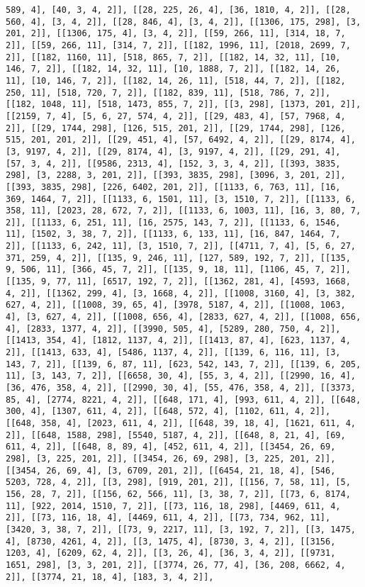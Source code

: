 \documentclass[12pt,fleqn]{article}\usepackage{../../common}
\begin{document}
\begin{verbatim}
589, 4], [40, 3, 4, 2]], [[28, 225, 26, 4], [36, 1810, 4, 2]], [[28, 560, 4], [3, 4, 2]], [[28, 846, 4], [3, 4, 2]], [[1306, 175, 298], [3, 201, 2]], [[1306, 175, 4], [3, 4, 2]], [[59, 266, 11], [314, 18, 7, 2]], [[59, 266, 11], [314, 7, 2]], [[182, 1996, 11], [2018, 2699, 7, 2]], [[182, 1160, 11], [518, 865, 7, 2]], [[182, 14, 32, 11], [10, 146, 7, 2]], [[182, 14, 32, 11], [10, 1888, 7, 2]], [[182, 14, 26, 11], [10, 146, 7, 2]], [[182, 14, 26, 11], [518, 44, 7, 2]], [[182, 250, 11], [518, 720, 7, 2]], [[182, 839, 11], [518, 786, 7, 2]], [[182, 1048, 11], [518, 1473, 855, 7, 2]], [[3, 298], [1373, 201, 2]], [[2159, 7, 4], [5, 6, 27, 574, 4, 2]], [[29, 483, 4], [57, 7968, 4, 2]], [[29, 1744, 298], [126, 515, 201, 2]], [[29, 1744, 298], [126, 515, 201, 201, 2]], [[29, 451, 4], [57, 6492, 4, 2]], [[29, 8174, 4], [3, 9197, 4, 2]], [[29, 8174, 4], [3, 9197, 4, 2]], [[29, 291, 4], [57, 3, 4, 2]], [[9586, 2313, 4], [152, 3, 3, 4, 2]], [[393, 3835, 298], [3, 2288, 3, 201, 2]], [[393, 3835, 298], [3096, 3, 201, 2]], [[393, 3835, 298], [226, 6402, 201, 2]], [[1133, 6, 763, 11], [16, 369, 1464, 7, 2]], [[1133, 6, 1501, 11], [3, 1510, 7, 2]], [[1133, 6, 358, 11], [2023, 28, 672, 7, 2]], [[1133, 6, 1003, 11], [16, 3, 80, 7, 2]], [[1133, 6, 251, 11], [16, 2575, 143, 7, 2]], [[1133, 6, 1546, 11], [1502, 3, 38, 7, 2]], [[1133, 6, 133, 11], [16, 847, 1464, 7, 2]], [[1133, 6, 242, 11], [3, 1510, 7, 2]], [[4711, 7, 4], [5, 6, 27, 371, 259, 4, 2]], [[135, 9, 246, 11], [127, 589, 192, 7, 2]], [[135, 9, 506, 11], [366, 45, 7, 2]], [[135, 9, 18, 11], [1106, 45, 7, 2]], [[135, 9, 77, 11], [6517, 192, 7, 2]], [[1362, 281, 4], [4593, 1668, 4, 2]], [[1362, 299, 4], [3, 1668, 4, 2]], [[1008, 3160, 4], [3, 382, 627, 4, 2]], [[1008, 39, 65, 4], [3978, 5187, 4, 2]], [[1008, 1063, 4], [3, 627, 4, 2]], [[1008, 656, 4], [2833, 627, 4, 2]], [[1008, 656, 4], [2833, 1377, 4, 2]], [[3990, 505, 4], [5289, 280, 750, 4, 2]], [[1413, 354, 4], [1812, 1137, 4, 2]], [[1413, 87, 4], [623, 1137, 4, 2]], [[1413, 633, 4], [5486, 1137, 4, 2]], [[139, 6, 116, 11], [3, 143, 7, 2]], [[139, 6, 87, 11], [623, 542, 143, 7, 2]], [[139, 6, 205, 11], [3, 143, 7, 2]], [[6658, 30, 4], [55, 3, 4, 2]], [[2990, 16, 4], [36, 476, 358, 4, 2]], [[2990, 30, 4], [55, 476, 358, 4, 2]], [[3373, 85, 4], [2774, 8221, 4, 2]], [[648, 171, 4], [993, 611, 4, 2]], [[648, 300, 4], [1307, 611, 4, 2]], [[648, 572, 4], [1102, 611, 4, 2]], [[648, 358, 4], [2023, 611, 4, 2]], [[648, 39, 18, 4], [1621, 611, 4, 2]], [[648, 1588, 298], [5540, 5187, 4, 2]], [[648, 8, 21, 4], [69, 611, 4, 2]], [[648, 8, 89, 4], [452, 611, 4, 2]], [[3454, 26, 69, 298], [3, 225, 201, 2]], [[3454, 26, 69, 298], [3, 225, 201, 2]], [[3454, 26, 69, 4], [3, 6709, 201, 2]], [[6454, 21, 18, 4], [546, 5203, 728, 4, 2]], [[3, 298], [919, 201, 2]], [[156, 7, 58, 11], [5, 156, 28, 7, 2]], [[156, 62, 566, 11], [3, 38, 7, 2]], [[73, 6, 8174, 11], [922, 2014, 1510, 7, 2]], [[73, 116, 18, 298], [4469, 611, 4, 2]], [[73, 116, 18, 4], [4469, 611, 4, 2]], [[73, 734, 962, 11], [3420, 3, 38, 7, 2]], [[73, 9, 2217, 11], [3, 192, 7, 2]], [[3, 1475, 4], [8730, 4261, 4, 2]], [[3, 1475, 4], [8730, 3, 4, 2]], [[3156, 1203, 4], [6209, 62, 4, 2]], [[3, 26, 4], [36, 3, 4, 2]], [[9731, 1651, 298], [3, 3, 201, 2]], [[3774, 26, 77, 4], [36, 208, 6662, 4, 2]], [[3774, 21, 18, 4], [183, 3, 4, 2]], 
\end{verbatim}
\end{document}
